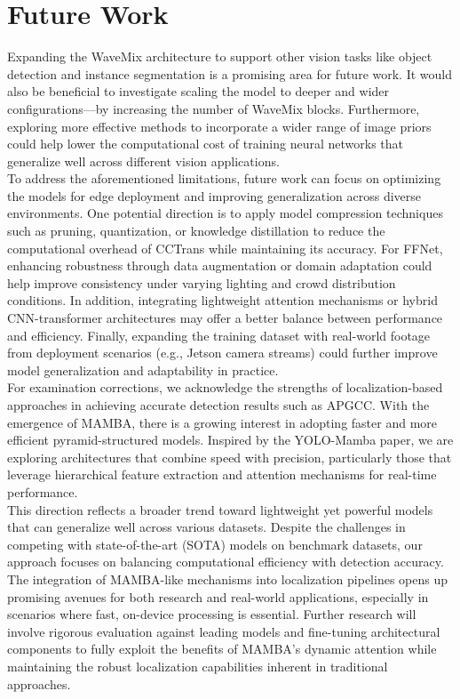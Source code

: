 \section{Future Work}
Expanding the WaveMix architecture to support other vision tasks like object detection and instance segmentation is a promising area for future work. It would also be beneficial to investigate scaling the model to deeper and wider configurations—by increasing the number of WaveMix blocks. Furthermore, exploring more effective methods to incorporate a wider range of image priors could help lower the computational cost of training neural networks that generalize well across different vision applications.\\
To address the aforementioned limitations, future work can focus on optimizing the models for edge deployment and improving generalization across diverse environments. One potential direction is to apply model compression techniques such as pruning, quantization, or knowledge distillation to reduce the computational overhead of CCTrans while maintaining its accuracy. For FFNet, enhancing robustness through data augmentation or domain adaptation could help improve consistency under varying lighting and crowd distribution conditions. In addition, integrating lightweight attention mechanisms or hybrid CNN-transformer architectures may offer a better balance between performance and efficiency. Finally, expanding the training dataset with real-world footage from deployment scenarios (e.g., Jetson camera streams) could further improve model generalization and adaptability in practice. \\
For examination corrections, we acknowledge the strengths of localization-based approaches in achieving accurate detection results such as APGCC. With the emergence of MAMBA, there is a growing interest in adopting faster and more efficient pyramid-structured models. Inspired by the YOLO-Mamba paper, we are exploring architectures that combine speed with precision, particularly those that leverage hierarchical feature extraction and attention mechanisms for real-time performance.\\
This direction reflects a broader trend toward lightweight yet powerful models that can generalize well across various datasets. Despite the challenges in competing with state-of-the-art (SOTA) models on benchmark datasets, our approach focuses on balancing computational efficiency with detection accuracy. The integration of MAMBA-like mechanisms into localization pipelines opens up promising avenues for both research and real-world applications, especially in scenarios where fast, on-device processing is essential. Further research will involve rigorous evaluation against leading models and fine-tuning architectural components to fully exploit the benefits of MAMBA’s dynamic attention while maintaining the robust localization capabilities inherent in traditional approaches.\\
